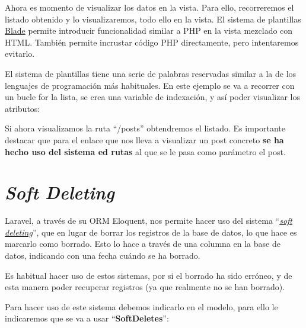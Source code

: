 
Ahora es momento de visualizar los datos en la vista. Para ello, recorreremos el listado obtenido y lo visualizaremos, todo ello en la vista. El sistema de plantillas \href{https://laravel.com/docs/10.x/blade}{Blade} permite introducir funcionalidad similar a PHP en la vista mezclado con HTML. También permite incrustar código PHP directamente, pero intentaremos evitarlo.

El sistema de plantillas tiene una serie de palabras reservadas similar a la de los lenguajes de programación más habituales. En este ejemplo se va a recorrer con un bucle for la lista, se crea una variable de indexación, y así poder visualizar los atributos:


Si ahora visualizamos la ruta “/posts” obtendremos el listado. Es importante destacar que para el enlace que nos lleva a visualizar un post concreto \textbf{se ha hecho uso del sistema ed rutas} al que se le pasa como parámetro el post.



\chapter{\textit{Soft Deleting}}

Laravel, a través de su ORM Eloquent, nos permite hacer uso del sistema “\textit{\href{https://laravel.com/docs/10.x/eloquent\#soft-deleting}{soft deleting}}”, que en lugar de borrar los registros de la base de datos, lo que hace es marcarlo como borrado. Esto lo hace a través de una columna en la base de datos, indicando con una fecha cuándo se ha borrado.

Es habitual hacer uso de estos sistemas, por si el borrado ha sido erróneo, y de esta manera poder recuperar registros (ya que realmente no se han borrado).

Para hacer uso de este sistema debemos indicarlo en el modelo, para ello le indicaremos que se va a usar “\textbf{SoftDeletes}”:

